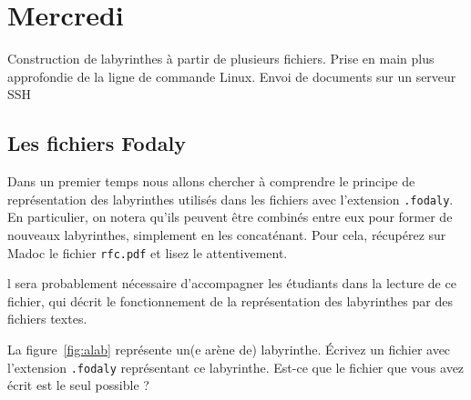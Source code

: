 \documentclass[a4paper]{article}
\newenvironment{objectif}{%
  \begin{framed}%
  \noindent{\bf Objectifs du jour~:}%
}{%
  \end{framed}%
}
\newenvironment{enseignants}[1]{\noindent\color{blue}{\bf #1}}{}
\begin{document}


\section{Mercredi}

\begin{objectif}
  Construction de labyrinthes à partir de plusieurs fichiers.
  Prise en main plus approfondie de la ligne de commande Linux.
  Envoi de documents sur un serveur SSH
\end{objectif}

\subsection{Les fichiers Fodaly}

Dans un premier temps nous allons chercher à comprendre le principe de représentation des labyrinthes utilisés dans les fichiers avec l'extension \verb|.fodaly|.
En particulier, on notera qu'ils peuvent être combinés entre eux pour former de nouveaux labyrinthes, simplement en les concaténant.
Pour cela, récupérez sur Madoc le fichier \verb|rfc.pdf| et lisez le attentivement.

\begin{enseignants}
  Il sera probablement nécessaire d'accompagner les étudiants dans la lecture de ce fichier, qui décrit le fonctionnement de la représentation des labyrinthes par des fichiers textes.
\end{enseignants}

La figure~\ref{fig:alab} représente un(e arène de) labyrinthe.
Écrivez un fichier avec l'extension \verb|.fodaly| représentant ce labyrinthe.
Est-ce que le fichier que vous avez écrit est le seul possible ?
\end{document}
